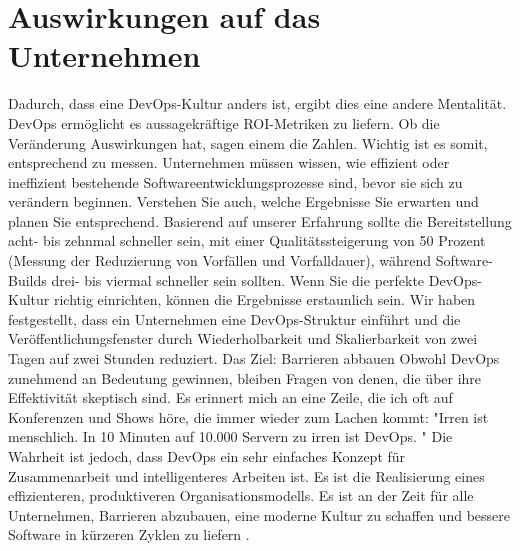 \section{Auswirkungen auf das Unternehmen}
Dadurch, dass eine DevOps-Kultur anders ist, ergibt dies eine andere Mentalität. 
DevOps ermöglicht es aussagekräftige ROI-Metriken zu liefern. Ob die Veränderung Auswirkungen hat, sagen einem die Zahlen. Wichtig ist es somit, entsprechend zu messen.
Unternehmen müssen wissen, wie effizient oder ineffizient bestehende Softwareentwicklungsprozesse sind, bevor sie sich zu verändern beginnen.
Verstehen Sie auch, welche Ergebnisse Sie erwarten und planen Sie entsprechend. Basierend auf unserer Erfahrung sollte die Bereitstellung acht- bis zehnmal schneller sein, mit einer Qualitätssteigerung von 50 Prozent (Messung der Reduzierung von Vorfällen und Vorfalldauer), während Software-Builds drei- bis viermal schneller sein sollten.
Wenn Sie die perfekte DevOps-Kultur richtig einrichten, können die Ergebnisse erstaunlich sein. Wir haben festgestellt, dass ein Unternehmen eine DevOps-Struktur einführt und die Veröffentlichungsfenster durch Wiederholbarkeit und Skalierbarkeit von zwei Tagen auf zwei Stunden reduziert.
Das Ziel: Barrieren abbauen
Obwohl DevOps zunehmend an Bedeutung gewinnen, bleiben Fragen von denen, die über ihre Effektivität skeptisch sind. Es erinnert mich an eine Zeile, die ich oft auf Konferenzen und Shows höre, die immer wieder zum Lachen kommt: "Irren ist menschlich. In 10 Minuten auf 10.000 Servern zu irren ist DevOps. "
Die Wahrheit ist jedoch, dass DevOps ein sehr einfaches Konzept für Zusammenarbeit und intelligenteres Arbeiten ist. Es ist die Realisierung eines effizienteren, produktiveren Organisationsmodells. Es ist an der Zeit für alle Unternehmen, Barrieren abzubauen, eine moderne Kultur zu schaffen und bessere Software in kürzeren Zyklen zu liefern \cite{DevOps.2016}.
